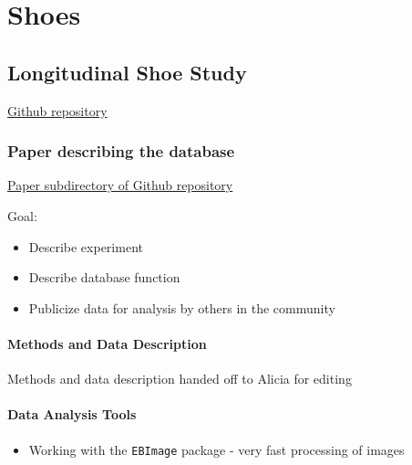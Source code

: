 \documentclass[]{book}
\providecommand{\tightlist}{%
  \setlength{\itemsep}{0pt}\setlength{\parskip}{0pt}}
\begin{document}
\hypertarget{shoes}{%
\chapter{Shoes}\label{shoes}}

\hypertarget{longitudinal}{%
\section{Longitudinal Shoe Study}\label{longitudinal}}

\href{https://github.com/CSAFE-ISU/Longitudinal_Shoe_Study}{Github repository}

\hypertarget{paper-describing-the-database}{%
\subsection{Paper describing the database}\label{paper-describing-the-database}}

\href{https://github.com/CSAFE-ISU/Longitudinal_Shoe_Study/tree/master/Paper}{Paper subdirectory of Github repository}

Goal:

\begin{itemize}
\tightlist
\item
  Describe experiment
\item
  Describe database function
\item
  Publicize data for analysis by others in the community
\end{itemize}

\hypertarget{lss-paper-methods}{%
\subsubsection*{Methods and Data Description}\label{lss-paper-methods}}

Methods and data description handed off to Alicia for editing

\hypertarget{lss-paper-analysis}{%
\subsubsection*{Data Analysis Tools}\label{lss-paper-analysis}}

\begin{itemize}
\tightlist
\item
  Working with the \texttt{EBImage} package - very fast processing of images
\end{itemize}
\end{document}
